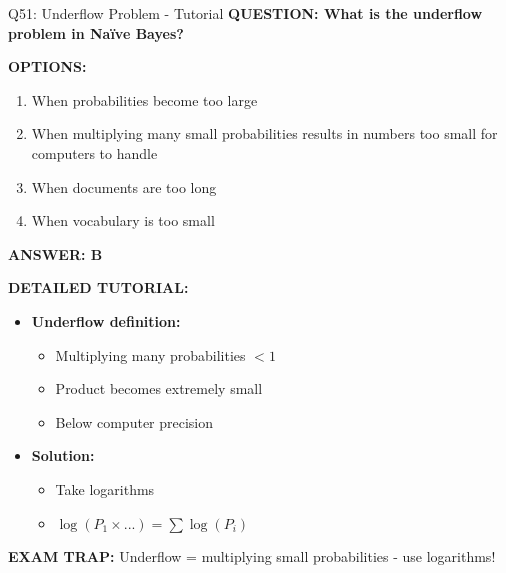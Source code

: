 \documentclass[8pt]{beamer}
\begin{document}
	\begin{frame}{Q51: Underflow Problem - Tutorial}
		\fontsize{6.5}{7.5}\selectfont
		\textbf{QUESTION: What is the underflow problem in Naïve Bayes?}
		
		\vspace{0.1cm}
		\textbf{OPTIONS:}
		\begin{enumerate}
			\item When probabilities become too large
			\item When multiplying many small probabilities results in numbers too small for computers to handle
			\item When documents are too long
			\item When vocabulary is too small
		\end{enumerate}
		
		\vspace{0.1cm}
		\textcolor{myblue}{\textbf{ANSWER: B}}
		
		\vspace{0.1cm}
		\textbf{DETAILED TUTORIAL:}
		\begin{itemize}
			\item \textbf{Underflow definition:}
			\begin{itemize}
				\item Multiplying many probabilities $< 1$
				\item Product becomes extremely small
				\item Below computer precision
			\end{itemize}
			\item \textbf{Solution:}
			\begin{itemize}
				\item Take logarithms
				\item $\log(P_1 \times ...) = \sum \log(P_i)$
			\end{itemize}
		\end{itemize}
		
		\textcolor{myred}{\textbf{EXAM TRAP:}} Underflow = \textcolor{myblue}{multiplying small probabilities} - use logarithms!
	\end{frame}
	
\end{document}

